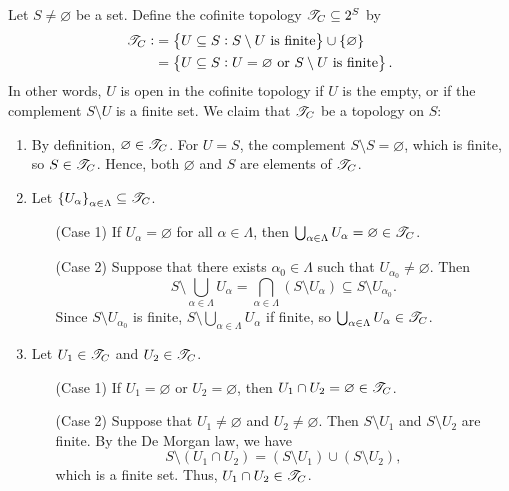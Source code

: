 \documentclass[11pt,openany]{article}
\begin{document}
\begin{example}
	Let $S\neq\varnothing$ be a set. Define the cofinite topology $\mathscr{T}_C\subseteq 2^S$ by \begin{align*}
	\topology_C:&=\set{U\subseteq S:S\setminus U\ \text{is finite}}\cup\set{\varnothing}\\
	&=\set{U\subseteq S:U=\varnothing\ \text{or}\ S\setminus U\ \text{is finite}}.
	\end{align*} In other words, $U$ is open in the cofinite topology if $U$ is the empty, or if the complement $S\setminus U$ is a finite set. We claim that $\mathscr{T}_C$ be a topology on $S$:
	\begin{enumerate}[(O1)]
		\item By definition, $\varnothing\in\mathscr{T}_C$. For $U=S$, the complement $S\setminus S=\varnothing$, which is finite, so $S\in\mathscr{T}_C$. Hence, both $\varnothing$ and $S$ are elements of $\mathscr{T}_C$.
		\item Let $\set{U_\alpha}_{\alpha\in\Lambda}\subseteq\mathscr{T}_C$. 
		\begin{itemize}
			\item[(Case 1)] If $U_\alpha=\varnothing$ for all $\alpha\in \Lambda$, then $\bigcup_{\alpha\in\Lambda}U_\alpha=\varnothing\in\mathscr{T}_C$. 
			\item[(Case 2)] Suppose that there exists $\alpha_0\in\Lambda$ such that $U_{\alpha_0}\neq\varnothing$. Then \[
			S\setminus\bigcup_{\alpha\in\Lambda}U_\alpha=\bigcap_{\alpha\in\Lambda}\left(S\setminus U_\alpha\right)\subseteq S\setminus U_{\alpha_0}.
			\]
			Since $S\setminus U_{\alpha_0}$ is finite, $S\setminus\bigcup_{\alpha\in\Lambda}U_\alpha$ if finite, so $\bigcup_{\alpha\in\Lambda} U_\alpha\in\mathscr{T}_C$.
		\end{itemize}
		\item Let $U_1\in\mathscr{T}_C$ and $U_2\in\mathscr{T}_C$. 
		\begin{itemize}
			\item[(Case 1)] If $U_1=\varnothing$ or $U_2=\varnothing$, then $U_1\cap U_2=\varnothing\in\mathscr{T}_C$. 
			\item[(Case 2)] Suppose that $U_1\neq\varnothing$ and $U_2\neq\varnothing$. Then $S\setminus U_1$ and $S\setminus U_2$ are finite. By the De Morgan law, we have \[
			S\setminus(U_1\cap U_2)=(S\setminus U_1)\cup (S\setminus U_2),
			\] which is a finite set. Thus, $U_1\cap U_2\in\mathscr{T}_C$.
		\end{itemize}
	\end{enumerate}
\end{example}
\end{document}
